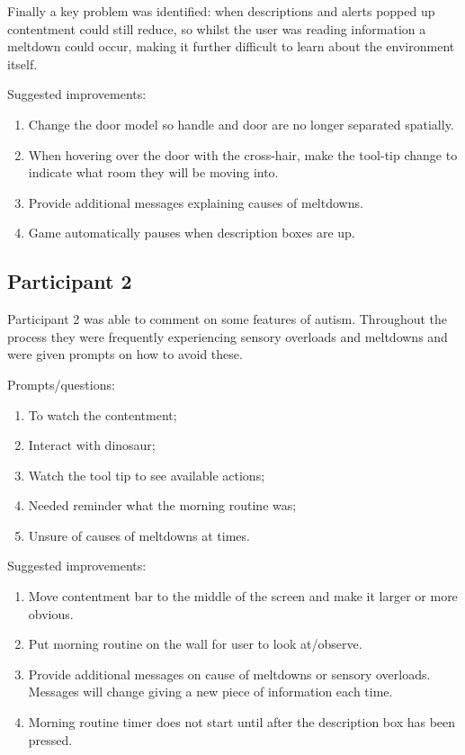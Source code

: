 \documentclass[11pt]{report}
\begin{document}
Finally a key problem was identified: when descriptions and alerts popped up contentment could still reduce, so whilst the user was reading information a meltdown could occur, making it further difficult to learn about the environment itself.

Suggested improvements:
\begin{enumerate}
\item Change the door model so handle and door are no longer separated spatially. 
\item When hovering over the door with the cross-hair, make the tool-tip change to indicate what room they will be moving into. 
\item Provide additional messages explaining causes of meltdowns.
\item Game automatically pauses when description boxes are up.
\end{enumerate}

\subsection*{Participant 2} 
Participant 2 was able to comment on some features of autism. Throughout the process they were frequently experiencing sensory overloads and meltdowns and were given prompts on how to avoid these.

Prompts/questions:
\begin{enumerate}
\item To watch the contentment;
\item Interact with dinosaur;
\item Watch the tool tip to see available actions;
\item Needed reminder what the morning routine was;
\item Unsure of causes of meltdowns at times.
\end{enumerate}

Suggested improvements:
\begin{enumerate}
\item Move contentment bar to the middle of the screen and make it larger or more obvious. 
\item Put morning routine on the wall for user to look at/observe. 
\item Provide additional messages on cause of meltdowns or sensory overloads. Messages will change giving a new piece of information each time.
\item Morning routine timer does not start until after the description box has been pressed. 
\end{enumerate}
\end{document}
